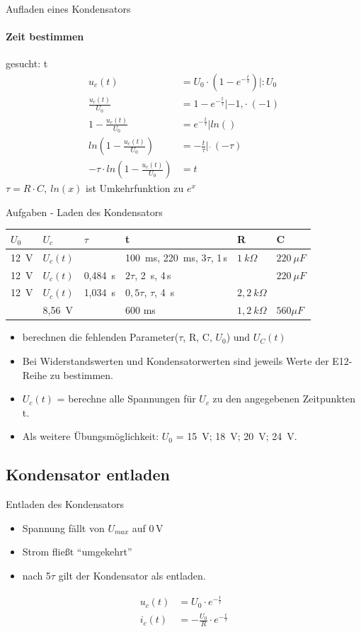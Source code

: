 \begin{frame}{Aufladen eines Kondensators}
  \framesubtitle{Zeit bestimmen}
  gesucht: t
  \begin{align}
    u_c(t) &= U_0 \cdot (1- e^{-\frac{t}{\tau}})| : U_0\\
    \frac{u_c(t)}{U_0} &= 1- e^{-\frac{t}{\tau}}|-1, \cdot \ (-1) \\
    1-\frac{u_c(t)}{U_0} &= e^{-\frac{t}{\tau}}| ln()\\
    ln\left(1-\frac{u_c(t)}{U_0}\right) &= -\frac{t}{\tau}|\ \dot \  (-\tau)\\
    - \tau \cdot ln\left(1-\frac{u_c(t)}{U_0}\right) &= t
  \end{align}
   $\tau = R\cdot C,\ ln(x)$ ist Umkehrfunktion zu $e^x$
\end{frame}

\begin{frame}{Aufgaben - Laden des Kondensators}
\begin{tabular}{|l|l|l|l|l|l|}
  \hline
 $U_0$  & $U_c$    & $\tau$    & t &            R &  C\\ \hline
 12\, V & $U_c(t)$ &           & 100\ ms, 220\ ms, $3\tau$, 1\,s  & $1\ k\Omega$ & $220\ \mu F$\\ \hline
 12\, V & $U_c(t)$ & 0,484\, s & $2\tau$, 2\, s, 4\,s  &  & $220\ \mu F$\\ \hline
 12\, V & $U_c(t)$ & 1,034\, s & $0,5\tau$, $\tau$, 4\, s & $2,2\ k\Omega$ & \\ \hline
        & 8,56\, V & & 600 ms & $1,2\ k\Omega$ & $560 \mu F$ \\ \hline
\end{tabular}
\begin{itemize}
  \item berechnen die fehlenden Parameter($\tau$, R, C, $U_0$) und $U_C(t)$
 \item Bei Widerstandswerten und Kondensatorwerten sind jeweils Werte der E12-Reihe zu bestimmen.
 \item $U_c(t)$ = berechne alle Spannungen für $U_c$ zu den angegebenen Zeitpunkten t.
 \item Als weitere Übungsmöglichkeit: $U_0$ = 15\, V; 18\, V; 20\, V; 24\, V.
\end{itemize}
\end{frame}

\subsection{Kondensator entladen}
\begin{frame}{Entladen des Kondensators}
 \begin{itemize}
   \item Spannung fällt von $U_{max}$ auf 0\,V
   \item Strom fließt "`umgekehrt"'
   \item nach 5$\tau$ gilt der Kondensator als entladen.
 \end{itemize}
 \begin{align}
   u_c(t) &= U_0\cdot e^{-\frac{t}{\tau}}\\
   i_c(t) &= -\frac{U_0}{R}\cdot e^{-\frac{t}{\tau}}
 \end{align}
\end{frame}

